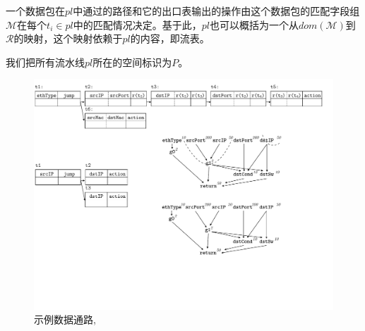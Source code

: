 一个数据包在$pl$中通过的路径和它的出口表输出的操作由这个数据包的匹配字段组$\mathcal{M}$在每个$t_i \in pl$中的匹配情况决定。基于此，$pl$也可以概括为一个从$dom(\mathcal{M})$到$\mathcal{R}$的映射，这个映射依赖于$pl$的内容，即流表。

我们把所有流水线$pl$所在的空间标识为$P$。





\begin{figure}[tbh]
    \centering
    \includegraphics[width=0.9\linewidth]{figures/figure3.pdf}
    \caption{示例数据通路, \exampledp}
    \label{cap:fig:swPipeline}
\end{figure}


